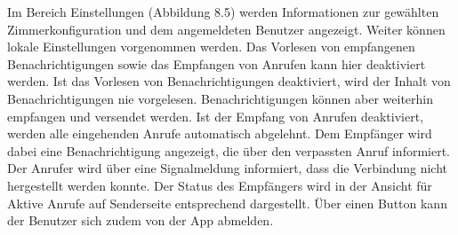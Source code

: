 Im Bereich Einstellungen (Abbildung 8.5) werden Informationen zur gewählten Zimmerkonfiguration und dem angemeldeten Benutzer angezeigt.
Weiter können lokale Einstellungen vorgenommen werden.
Das Vorlesen von empfangenen Benachrichtigungen sowie das Empfangen von Anrufen kann hier deaktiviert werden.
Ist das Vorlesen von Benachrichtigungen deaktiviert, wird der Inhalt von Benachrichtigungen nie vorgelesen.
Benachrichtigungen können aber weiterhin empfangen und versendet werden.
Ist der Empfang von Anrufen deaktiviert, werden alle eingehenden Anrufe automatisch abgelehnt.
Dem Empfänger wird dabei eine Benachrichtigung angezeigt, die über den verpassten Anruf informiert.
Der Anrufer wird über eine Signalmeldung informiert, dass die Verbindung nicht hergestellt werden konnte.
Der Status des Empfängers wird in der Ansicht für Aktive Anrufe auf Senderseite entsprechend dargestellt.
Über einen Button kann der Benutzer sich zudem von der App abmelden.

